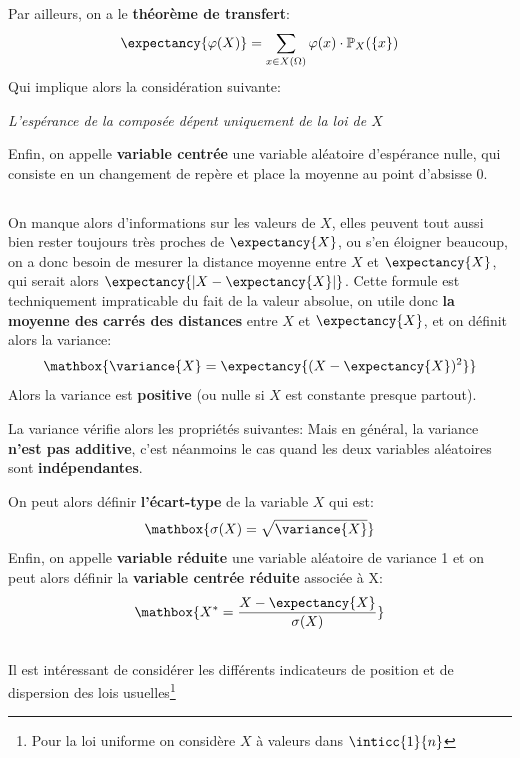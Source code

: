 Par ailleurs, on a le \textbf{théorème de transfert}:
\[
   \expectancy{\varphi(X)} = \sum_{x \in X(\Omega)} \varphi(x)\cdot\mathbb{P}_X(\{x\})
\]
Qui implique alors la considération suivante:
\begin{center}
   \textit{L'espérance de la composée dépent uniquement de la loi de \(X\)}
\end{center}
Enfin, on appelle \textbf{variable centrée} une variable aléatoire d'espérance nulle, qui consiste en un changement de repère et place la moyenne au point d'absisse 0.

\subsection*{}
On manque alors d'informations sur les valeurs de \(X\), elles peuvent tout aussi bien rester toujours très
proches de \(\expectancy{X}\), ou s'en éloigner beaucoup, on a donc besoin de mesurer la distance moyenne entre \(X\) et \(\expectancy{X}\), qui serait alors \(\expectancy{| X - \expectancy{X} |}\).\+
Cette formule est techniquement impraticable du fait de la valeur absolue, on utile donc \textbf{la moyenne des carrés des distances} entre \(X\) et \(\expectancy{X}\), et on définit alors la variance:
\[
   \mathbox{
      \variance{X} = \expectancy{(X - \expectancy{X})^2}
   }   
\]
Alors la variance est \textbf{positive} (ou nulle si \(X\) est constante presque partout).\<
\pagebreak

La variance vérifie alors les propriétés suivantes:
Mais en général, la variance \textbf{n'est pas additive}, c'est néanmoins le cas quand les deux variables aléatoires sont \textbf{indépendantes}.\<

On peut alors définir \textbf{l'écart-type} de la variable \(X\) qui est:
\[
   \mathbox{
      \sigma(X) = \sqrt{\variance{X}}  
   }
\]
Enfin, on appelle \textbf{variable réduite} une variable aléatoire de variance 1 et on peut alors définir la \textbf{variable centrée réduite} associée à X:
\[
   \mathbox{
     X^*= \frac{X - \expectancy{X}}{\sigma(X)} 
   }   
\]

\subsection*{}
Il est intéressant de considérer les différents indicateurs de position et de dispersion des lois usuelles\footnote{Pour la loi uniforme on considère \(X\) à valeurs dans \(\inticc{1}{n}\)}

